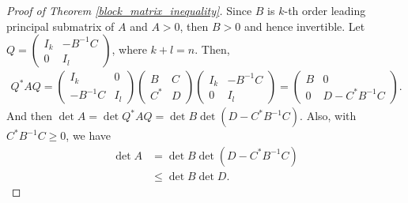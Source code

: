 \documentclass[11pt]{book}
\theoremstyle{definition}
\numberwithin{equation}{chapter}
\begin{document}
\begin{proof}[Proof of Theorem \ref{block_matrix_inequality}]
Since $B$ is $k$-th order leading principal submatrix of $A$ and $A > 0$, then $B > 0$ and hence invertible. Let $Q = \begin{pmatrix} I_k & -B^{-1}C \\ 0 & I_l \end{pmatrix}$, where $k + l = n$. Then,
\begin{align*}
    Q^* A Q = \begin{pmatrix} I_k & 0 \\ -B^{-1}C & I_l \end{pmatrix} \begin{pmatrix} B & C \\ C^* & D \end{pmatrix} \begin{pmatrix} I_k & -B^{-1}C \\ 0 & I_l \end{pmatrix} = \begin{pmatrix} B & 0 \\ 0 & D - C^*B^{-1}C \end{pmatrix}.
\end{align*}
And then $\det A = \det Q^* A Q = \det B \det (D - C^*B^{-1}C)$. Also, with $C^*B^{-1}C \geq 0$, we have
\begin{align*}
    \det A & = \det B \det (D - C^*B^{-1}C) \\
    & \leq \det B \det D.
\end{align*}
\end{proof}
\end{document}
